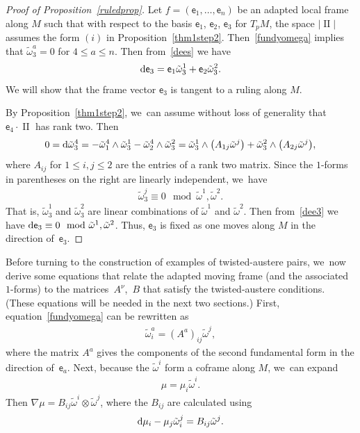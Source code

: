 \documentclass[10pt,a4paper]{amsart}
\def\ve{\mathsf{e}}
\def\II{\operatorname{II}} %
\def\tw{\tilde\omega}
\def\wt{\tilde\omega}
\numberwithin{equation}{section}
\begin{document}
\begin{proof}[Proof of Proposition~\ref{ruledprop}]
Let $f=(\ve_1, \dots, \ve_n)$ be an adapted local frame along $M$ such that with respect to the basis $\ve_1$, $\ve_2$, $\ve_3$ for $T_p M$, the space $|\II|$ assumes the form $(i)$ in Proposition~\ref{thm1step2}. Then~\eqref{fundyomega} implies that $\wt^a_3=0$ for $4 \le a \le n$. Then from~\eqref{dees} we have
\begin{gather} \label{dee3}
{\rm d}\ve_3 = \ve_1 \wt^1_3 + \ve_2 \wt^2_3.
\end{gather}
We will show that the frame vector $\ve_3$ is tangent to a ruling along $M$.

By Proposition~\ref{thm1step2}, we~can assume without loss of generality that $\ve_4 \cdot \II$ has rank two. Then
\begin{gather*}
0 = {\rm d}\wt^4_3 = -\wt^4_1 \wedge \wt^1_3 - \wt^4_2 \wedge \wt^2_3 = \wt^1_3 \wedge \big(A_{1j} \wt^j\big) + \wt^2_3 \wedge \big(A_{2j} \wt^j\big),
\end{gather*}
where $A_{ij}$ for $1\le i,j \le 2$ are the entries of a rank two matrix. Since the $1$-forms in parentheses on the right are linearly independent, we~have
\begin{gather} \label{noturn}
\wt^j_3 \equiv 0 \mod \wt^1, \wt^2.
\end{gather}
That is, $\wt^1_3$ and $\wt^2_3$ are linear combinations of $\wt^1$ and $\wt^2$. Then from~\eqref{dee3} we have ${\rm d}\ve_3 \equiv 0 \mod \wt^1, \wt^2$. Thus, $\ve_3$ is fixed as one moves along $M$ in the direction of~$\ve_3$.
\end{proof}

Before turning to the construction of examples of twisted-austere pairs, we~now derive some equations that relate the adapted moving frame (and the associated
$1$-forms) to the matri\-ces~$A^\nu$,~$B$ that satisfy the twisted-austere conditions. (These equations will be needed in the next two sections.)
First, equation~\eqref{fundyomega} can be rewritten as
\begin{gather} \label{waiA}
\tw^a_i = (A^a)_{ij} \tw^j,
\end{gather}
where the matrix $A^a$ gives the components of the second fundamental form in the direction of~$\ve_a$. Next, because the $\wt^i$ form a coframe
along $M$, we~can expand
\begin{gather*} %
\mu = \mu_i \tw^i.
\end{gather*}
Then $\nabla \mu = B_{ij} \wt^i \otimes \wt^j$, where the $B_{ij}$ are calculated using
\begin{gather} \label{demuse}
{\rm d}\mu_i - \mu_j \wt^j_i = B_{ij} \wt^j.
\end{gather}
\end{document}
